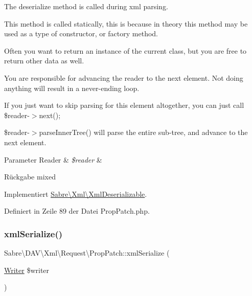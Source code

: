 The deserialize method is called during xml parsing.

This method is called statically, this is because in theory this method may be used as a type of constructor, or factory method.

Often you want to return an instance of the current class, but you are free to return other data as well.

You are responsible for advancing the reader to the next element. Not doing anything will result in a never-\/ending loop.

If you just want to skip parsing for this element altogether, you can just call \$reader-\/$>$next();

\$reader-\/$>$parse\+Inner\+Tree() will parse the entire sub-\/tree, and advance to the next element.


\begin{DoxyParams}[1]{Parameter}
Reader & {\em \$reader} & \\
\hline
\end{DoxyParams}
\begin{DoxyReturn}{Rückgabe}
mixed 
\end{DoxyReturn}


Implementiert \mbox{\hyperlink{interface_sabre_1_1_xml_1_1_xml_deserializable_a19e0eca545b9a0d93f7d6b69085ade30}{Sabre\textbackslash{}\+Xml\textbackslash{}\+Xml\+Deserializable}}.



Definiert in Zeile 89 der Datei Prop\+Patch.\+php.

\mbox{\label{class_sabre_1_1_d_a_v_1_1_xml_1_1_request_1_1_prop_patch_a6387552bc8dabc8ba491ead0c84886ea}} 
\subsubsection{\texorpdfstring{xml\+Serialize()}{xmlSerialize()}}
{\footnotesize\ttfamily Sabre\textbackslash{}\+D\+A\+V\textbackslash{}\+Xml\textbackslash{}\+Request\textbackslash{}\+Prop\+Patch\+::xml\+Serialize (\begin{DoxyParamCaption}\item[{\mbox{\hyperlink{class_sabre_1_1_xml_1_1_writer}{Writer}}}]{\$writer }\end{DoxyParamCaption})}

